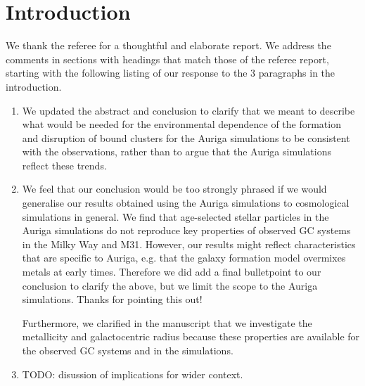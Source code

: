 \documentclass{article}
\begin{document}
\section*{Introduction}
We thank the referee for a thoughtful and elaborate report. We address the 
comments in sections with headings that match those of the referee report, 
starting with the following listing of our response to the 3 paragraphs in 
the introduction.
\begin{enumerate}
\item We updated the abstract and conclusion to clarify that we meant to describe
what would be needed for the environmental dependence of the formation and disruption
of bound clusters for the Auriga simulations to be consistent with the observations,
rather than to argue that the Auriga simulations reflect these trends.
\item
We feel that our conclusion would be too strongly phrased if we would generalise 
our results obtained using the Auriga simulations to cosmological simulations 
in general. We find that age-selected stellar particles in the Auriga simulations 
do not reproduce key properties of observed GC systems in the Milky Way and M31.
However, our results might reflect characteristics that are specific to Auriga, 
e.g. that the galaxy formation model overmixes metals at early times. 
Therefore we did add a final bulletpoint to our conclusion to clarify the above, 
but we limit the scope to the Auriga simulations. Thanks for pointing this out!

Furthermore, we clarified in the manuscript that we investigate the metallicity
and galactocentric radius because these properties are available for the observed
GC systems and in the simulations.
\item TODO: disussion of implications for wider context.
\end{enumerate}
\end{document}
